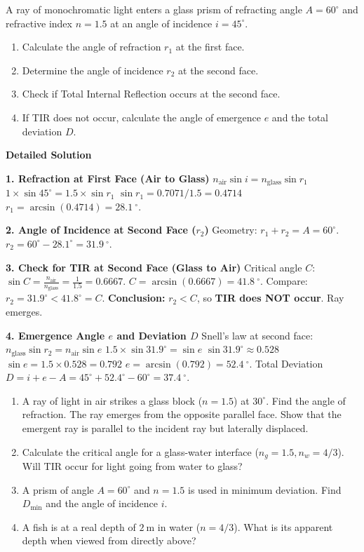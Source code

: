 \documentclass[11pt]{article}
\begin{document}
\begin{exoresolu}
A ray of monochromatic light enters a glass prism of refracting angle $A = 60^\circ$ and refractive index $n = 1.5$ at an angle of incidence $i = 45^\circ$.
\begin{enumerate}
\item Calculate the angle of refraction $r_1$ at the first face.
\item Determine the angle of incidence $r_2$ at the second face.
\item Check if Total Internal Reflection occurs at the second face.
\item If TIR does not occur, calculate the angle of emergence $e$ and the total deviation $D$.
\end{enumerate}
\tcblower
\textbf{Detailed Solution}

\textbf{1. Refraction at First Face (Air to Glass)}
$n_{\text{air}} \sin i = n_{\text{glass}} \sin r_1$
$1 \times \sin 45^\circ = 1.5 \times \sin r_1$
$\sin r_1 = 0.7071 / 1.5 = 0.4714$
$r_1 = \arcsin(0.4714) = \SI{28.1}{\ensuremath{{}^{\circ}}}$.

\textbf{2. Angle of Incidence at Second Face ($r_2$)}
Geometry: $r_1 + r_2 = A = 60^\circ$.
$r_2 = 60^\circ - 28.1^\circ = \SI{31.9}{\ensuremath{{}^{\circ}}}$.

\textbf{3. Check for TIR at Second Face (Glass to Air)}
Critical angle $C$: $\sin C = \frac{n_{\text{air}}}{n_{\text{glass}}} = \frac{1}{1.5} = 0.6667$.
$C = \arcsin(0.6667) = \SI{41.8}{\ensuremath{{}^{\circ}}}$.
Compare: $r_2 = 31.9^\circ < 41.8^\circ = C$.
\textbf{Conclusion:} $r_2 < C$, so \textbf{TIR does NOT occur}. Ray emerges.

\textbf{4. Emergence Angle $e$ and Deviation $D$}
Snell's law at second face: $n_{\text{glass}} \sin r_2 = n_{\text{air}} \sin e$
$1.5 \times \sin 31.9^\circ = \sin e$
$\sin 31.9^\circ \approx 0.528$
$\sin e = 1.5 \times 0.528 = 0.792$
$e = \arcsin(0.792) = \SI{52.4}{\ensuremath{{}^{\circ}}}$.
Total Deviation $D = i + e - A = 45^\circ + 52.4^\circ - 60^\circ = \SI{37.4}{\ensuremath{{}^{\circ}}}$.
\end{exoresolu}

\begin{exercice}
\begin{enumerate}
\item A ray of light in air strikes a glass block ($n=1.5$) at $30^\circ$. Find the angle of refraction. The ray emerges from the opposite parallel face. Show that the emergent ray is parallel to the incident ray but laterally displaced.
\item Calculate the critical angle for a glass-water interface ($n_g=1.5, n_w=4/3$). Will TIR occur for light going from water to glass?
\item A prism of angle $A=60^\circ$ and $n=1.5$ is used in minimum deviation. Find $D_{\min}$ and the angle of incidence $i$.
\item A fish is at a real depth of $2\ \mathrm{m}$ in water ($n=4/3$). What is its apparent depth when viewed from directly above?
\end{enumerate}
\end{exercice}
\end{document}
